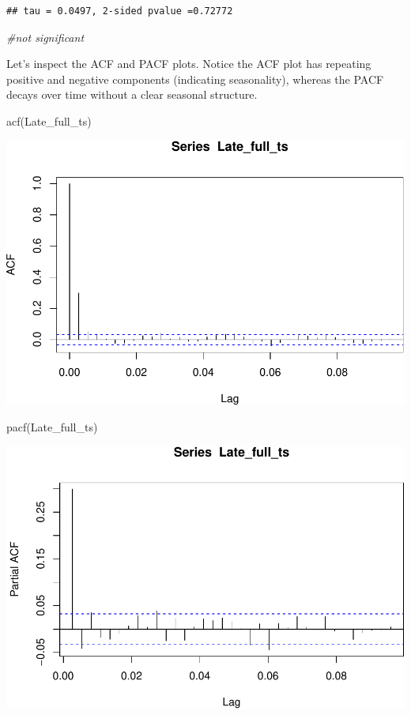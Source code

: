 \documentclass[
  12pt,
]{article}
\newenvironment{Shaded}{\begin{snugshade}}{\end{snugshade}}
\newcommand{\CommentTok}[1]{\textcolor[rgb]{0.56,0.35,0.01}{\textit{#1}}}
\newcommand{\FunctionTok}[1]{\textcolor[rgb]{0.00,0.00,0.00}{#1}}
\newcommand{\NormalTok}[1]{#1}
\begin{document}
\begin{verbatim}
## tau = 0.0497, 2-sided pvalue =0.72772
\end{verbatim}

\begin{Shaded}
\begin{Highlighting}[]
\CommentTok{\#not significant }
\end{Highlighting}
\end{Shaded}

Let's inspect the ACF and PACF plots. Notice the ACF plot has repeating
positive and negative components (indicating seasonality), whereas the
PACF decays over time without a clear seasonal structure.

\begin{Shaded}
\begin{Highlighting}[]
\FunctionTok{acf}\NormalTok{(Late\_full\_ts) }
\end{Highlighting}
\end{Shaded}

\includegraphics{Project_Template_TLK_files/figure-latex/unnamed-chunk-1-1.pdf}

\begin{Shaded}
\begin{Highlighting}[]
\FunctionTok{pacf}\NormalTok{(Late\_full\_ts) }
\end{Highlighting}
\end{Shaded}

\includegraphics{Project_Template_TLK_files/figure-latex/unnamed-chunk-1-2.pdf}
\end{document}
